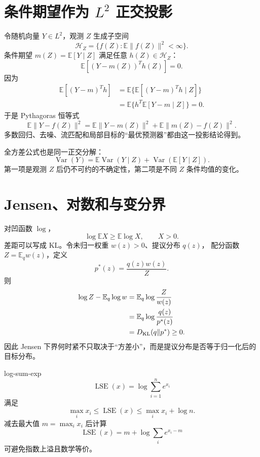 \documentclass[11pt]{article}
\numberwithin{equation}{section}
\newcommand{\E}{\mathbb{E}}
\newcommand{\1}{\mathbf{1}}
\newcommand{\Var}{\operatorname{Var}}
\begin{document}
\section{条件期望作为 $L^2$ 正交投影}

令随机向量 $Y\in L^2$，观测 $Z$ 生成子空间
\begin{equation}
 \mathcal H_Z=\{f(Z):\E\|f(Z)\|^2<\infty\}.
\end{equation}
条件期望 $m(Z)=\E[Y\mid Z]$ 满足任意 $h(Z)\in\mathcal H_Z$：
\begin{equation}
 \E[(Y-m(Z))^Th(Z)]=0.
\end{equation}
因为
\begin{align}
 \E[(Y-m)^Th]
 &=\E\{\E[(Y-m)^Th\mid Z]\}\\
 &=\E\{h^T\E[Y-m\mid Z]\}=0.
\end{align}
于是 Pythagoras 恒等式
\begin{equation}
 \E\|Y-f(Z)\|^2
 =\E\|Y-m(Z)\|^2+\E\|m(Z)-f(Z)\|^2.
\end{equation}
多数回归、去噪、流匹配和局部目标的“最优预测器”都由这一投影结论得到。

全方差公式也是同一正交分解：
\begin{equation}
 \Var(Y)=\E\Var(Y\mid Z)+\Var(\E[Y\mid Z]).
\end{equation}
第一项是观测 $Z$ 后仍不可约的不确定性，第二项是不同 $Z$ 条件均值的变化。

\section{Jensen、对数和与变分界}

对凹函数 $\log$，
\begin{equation}
 \log\E X\ge\E\log X,
 \qquad X>0.
\end{equation}
差距可以写成 KL。令未归一权重 $w(z)>0$、提议分布 $q(z)$，
配分函数 $Z=\E_qw(z)$，定义
\begin{equation}
 p^*(z)=\frac{q(z)w(z)}{Z}.
\end{equation}
则
\begin{align}
 \log Z-\E_q\log w
 &=\E_q\log\frac{Z}{w(z)}\\
 &=\E_q\log\frac{q(z)}{p^*(z)}\\
 &=D_{\rm KL}(q\|p^*)\ge0.
\end{align}
因此 Jensen 下界何时紧不只取决于“方差小”，而是提议分布是否等于归一化后的目标分布。

log-sum-exp
\begin{equation}
 \operatorname{LSE}(x)=\log\sum_{i=1}^{n}e^{x_i}
\end{equation}
满足
\begin{equation}
 \max_i x_i\le\operatorname{LSE}(x)
 \le\max_i x_i+\log n.
\end{equation}
减去最大值 $m=\max_ix_i$ 后计算
\begin{equation}
 \operatorname{LSE}(x)=m+\log\sum_ie^{x_i-m}
\end{equation}
可避免指数上溢且数学等价。
\end{document}
